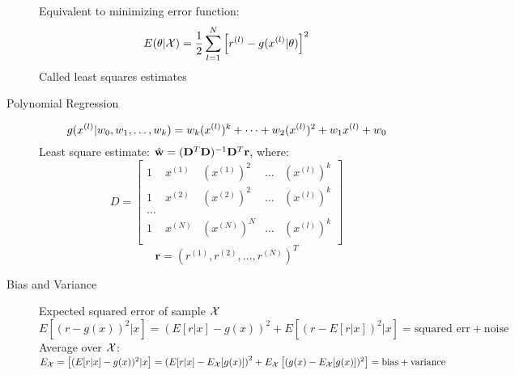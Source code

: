 \begin{description}
    Equivalent to minimizing error function:
    \[
        E(\theta|\mathcal{X}) = \frac{1}{2}\sum_{l=1}^N\left[ r^{(l)} - g(x^{(l)}|\theta) \right]^2
    \]
    Called least squares estimates
\item[Polynomial Regression] 
    \[ g(x^{(l)}|w_0, w_1, \dots, w_k) = w_k(x^{(l)})^k + \dots + w_2(x^{(l)})^2 + w_1x^{(l)}
        + w_0 \]
        Least square estimate: $\hat{\mathbf{w}} = (\mathbf{D}^T\mathbf{D})^{-1}\mathbf{D}^T\mathbf{r}$,
        where:
        \[ D = \begin{bmatrix}
            1 & x^{(1)} & (x^{(1)})^2  & \dots & (x^{(l)})^k \\
            1 & x^{(2)} & (x^{(2)})^2  & \dots & (x^{(l)})^k \\
            \dots\\
            1 & x^{(N)} & (x^{(N)})^N  & \dots & (x^{(l)})^k \\
        \end{bmatrix}
    \]
    \[ \mathbf{r} = \left( r^{(1)}, r^{(2)},\dots,r^{(N)} \right)^T \]
\item[Bias and Variance] Expected squared error of sample $\mathcal{X}$
    $E\left[ (r-g(x))^2|x \right] = \left( E\left[ r|x \right] - g(x) \right)^2+E\left[
        (r-E\left[ r|x \right])^2|x \right] = \mbox{squared err}+\mbox{noise}$\\
        Average over $\mathcal{X}$: $E_{\mathcal{X}} = \left[ (E[r|x]-g(x))^2|x\right] = \left(
        E[r|x]-E_{\mathcal{X}}[g(x)]\right)^2 + E_{\mathcal{X}}\left[ (g(x)-E_{\mathcal{X}}[g(x)])^2
    \right] = \mbox{bias}+\mbox{variance}$

\end{description}
